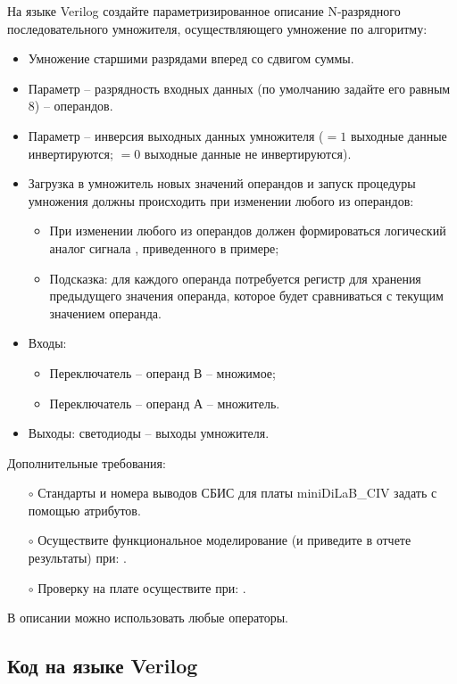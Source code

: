 На языке Verilog создайте параметризированное описание N-разрядного последовательного умножителя, осуществляющего умножение по алгоритму:
\begin{itemize}
	\item Умножение старшими разрядами вперед со сдвигом суммы.
	\item Параметр  -- разрядность входных данных (по умолчанию задайте его равным 8) -- операндов.
	\item Параметр  -- инверсия выходных данных умножителя ($=1$ выходные данные инвертируются; $=0$ выходные данные не инвертируются).
	\item Загрузка в умножитель новых значений операндов и запуск процедуры умножения должны происходить при изменении любого из операндов:
		\begin{itemize}
			\item При изменении любого из операндов должен формироваться логический аналог сигнала , приведенного в примере;
			\item Подсказка: для каждого операнда потребуется регистр для хранения предыдущего значения операнда, которое будет сравниваться с текущим значением операнда.
		\end{itemize}
	\item Входы:
		\begin{itemize}
			\item Переключатель  -- операнд В -- множимое;
			\item Переключатель  -- операнд А -- множитель.
		\end{itemize}
	\item Выходы: светодиоды  – выходы умножителя.
\end{itemize}

Дополнительные требования:
\begin{itemize}
	\item[$\circ$] Стандарты и номера выводов СБИС для платы miniDiLaB\_CIV задать с помощью атрибутов.
	\item[$\circ$] Осуществите функциональное моделирование (и приведите в отчете результаты) при: .
	\item[$\circ$] Проверку на плате осуществите при: .
\end{itemize}
В описании можно использовать любые операторы.

\newpage

\subsection{Код на языке Verilog}


